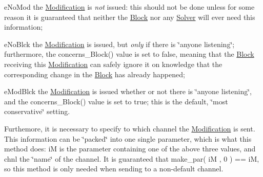 \begin{DoxyItemize}
\item e\+No\+Mod the \mbox{\hyperlink{class_s_m_spp__di__unipi__it_1_1_modification}{Modification}} is {\itshape not} issued\+: this should not be done unless for some reason it is guaranteed that neither the \mbox{\hyperlink{class_s_m_spp__di__unipi__it_1_1_block}{Block}} nor any \mbox{\hyperlink{class_s_m_spp__di__unipi__it_1_1_solver}{Solver}} will ever need this information;
\item e\+No\+Blck the \mbox{\hyperlink{class_s_m_spp__di__unipi__it_1_1_modification}{Modification}} is issued, but {\itshape only} if there is \char`\"{}anyone
            listening\char`\"{}; furthermore, the concerns\+\_\+\+Block() value is set to false, meaning that the \mbox{\hyperlink{class_s_m_spp__di__unipi__it_1_1_block}{Block}} receiving this \mbox{\hyperlink{class_s_m_spp__di__unipi__it_1_1_modification}{Modification}} can safely ignore it on knowledge that the corresponding change in the \mbox{\hyperlink{class_s_m_spp__di__unipi__it_1_1_block}{Block}} has already happened;
\item e\+Mod\+Blck the \mbox{\hyperlink{class_s_m_spp__di__unipi__it_1_1_modification}{Modification}} is issued whether or not there is \char`\"{}anyone
            listening\char`\"{}, and the concerns\+\_\+\+Block() value is set to true; this is the default, \char`\"{}most conservative\char`\"{} setting.
\end{DoxyItemize}

Furthemore, it is necessary to specify to which channel the \mbox{\hyperlink{class_s_m_spp__di__unipi__it_1_1_modification}{Modification}} is sent. This information can be \char`\"{}packed\char`\"{} into one single parameter, which is what this method does\+: iM is the parameter containing one of the above three values, and chnl the \char`\"{}name\char`\"{} of the channel. It is guaranteed that make\+\_\+par( i\+M , 0 ) == iM, so this method is only needed when sending to a non-\/default channel. \mbox{\label{class_s_m_spp__di__unipi__it_1_1_observer_a4869c34f8f2a2286c39fdce0521b93c9}} 
